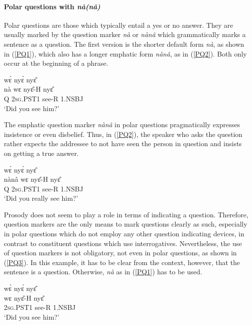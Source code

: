 \paragraph{Polar questions with {\itshape nà(nâ)}}

Polar questions are those which typically entail a yes or no answer.
They are usually marked by the question marker {\itshape nà} or {\itshape nànâ} which grammatically marks a sentence as a question. The first version is the shorter default form {\itshape nà}, as shown in (\ref{PQ1}), which also has a longer emphatic form {\itshape nànâ}, as in (\ref{PQ2}). Both only occur at the beginning of a phrase. 

\begin{exe}
\ex\label{PQ1}
  wɛ̀ nyɛ́ nyɛ̂  \\
            nà wɛ nyɛ̂-H nyɛ̂ \\
             Q 2\textsc{sg}.PST1 see-R 1.NSBJ  \\
    \trans `Did you see him?'
\end{exe}

The emphatic question marker {\itshape nànâ} in polar questions pragmatically expresses insistence or even disbelief. Thus, in (\ref{PQ2}), the speaker who asks the question rather expects the addressee to not have seen the person in question and insists on getting a true answer. 

\begin{exe}
\ex\label{PQ2}
   wɛ̀ nyɛ́ nyɛ̂ \\
            nànâ wɛ nyɛ̂-H nyɛ̂ \\
             Q 2\textsc{sg}.PST1 see-R 1.NSBJ \\
    \trans `Did you really see him?'
\end {exe}

Prosody does not seem to play a role in terms of indicating a question. Therefore, question markers are the only means to mark questions clearly as such, especially in polar questions which do not employ any other question indicating devices, in contrast to constituent questions which use interrogatives. Nevertheless, the use of question markers is not obligatory, not even in polar questions, as shown in (\ref{PQ3}). In this example, it has to be clear from the context, however, that the sentence is a question. Otherwise, {\itshape nà} as in (\ref{PQ1}) has to be used.

\begin{exe}
\ex\label{PQ3}
  \glll     wɛ̀ nyɛ́ nyɛ̂ \\
             wɛ nyɛ̂-H nyɛ̂ \\
               2\textsc{sg}.PST1 see-R 1.NSBJ \\
    \trans `Did you see him?'
\end {exe}

